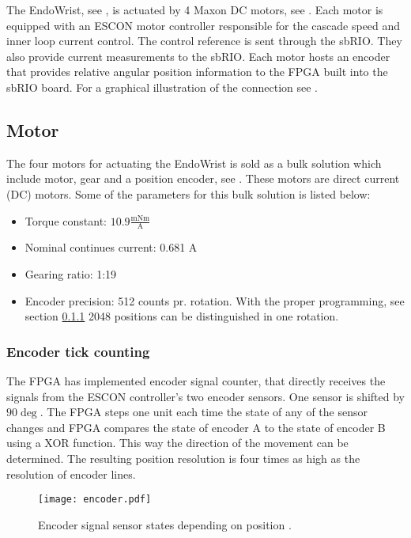 The EndoWrist, see , is actuated by 4 Maxon DC motors, see . Each motor is equipped with an ESCON motor controller responsible for the cascade speed and inner loop current control. The control reference is sent through the sbRIO. They also provide current measurements to the sbRIO. Each motor hosts an encoder that provides relative angular position information to the FPGA built into the sbRIO board. For a graphical illustration of the connection see .


\subsection{Motor}\label{Maxon_Motor}
The four motors for actuating the EndoWrist is sold as a bulk solution which include motor\cite{motor_motor}, gear\cite{motor_gear} and a position encoder\cite{motor_encoder}, see .
These motors are direct current (DC) motors. Some of the parameters for this bulk solution is listed below:

\begin{itemize}
\item Torque constant: $10.9\frac{\text{mNm}}{\text{A}}$
\item Nominal continues current: 0.681 A 
\item Gearing ratio: 1:19
\item Encoder precision: 512 counts pr. rotation. With the proper programming, see section \ref{encount} 2048 positions can be distinguished in one rotation.
\end{itemize}

\subsubsection{Encoder tick counting}
\label{encount}
The FPGA has implemented encoder signal counter, that directly receives the signals from  the ESCON controller's two encoder sensors. One sensor is shifted by $90\deg$. The FPGA steps one unit each time the state of any of the sensor changes and FPGA compares the state of encoder A to the state of encoder B using a XOR function. This way the direction of the movement can be determined. The resulting position resolution is four times as high as the resolution of encoder lines.

\begin{figure}[h]
	\centering
	\texttt{[image: encoder.pdf]}
	\caption{Encoder signal sensor states depending on position \cite{motor_encoder}.}
	\label{fig:encoder}
\end{figure}

